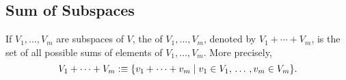 
\subsection{Sum of Subspaces}

\setcounter{thm}{35}
\begin{mydef}
  If $V_1, \ldots, V_m$ are subspaces of $V$, the  of $V_1, \ldots, V_m$, denoted by $V_1 + \cdots + V_m$, is the set of all possible sums of elements of $V_1, \ldots, V_m$. More precisely,
\begin{equation}
    V_1 + \cdots + V_m :\equiv \{v_1 + \cdots + v_m \mid v_1 \in V_1, {\, \ldots \,\,} , v_m \in V_m \}.
\end{equation}
\end{mydef}

